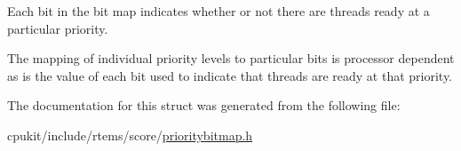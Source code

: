 Each bit in the bit map indicates whether or not there are threads ready at a particular priority. 

The mapping of individual priority levels to particular bits is processor dependent as is the value of each bit used to indicate that threads are ready at that priority. 

The documentation for this struct was generated from the following file\+:\begin{DoxyCompactItemize}
\item 
cpukit/include/rtems/score/\mbox{\hyperlink{prioritybitmap_8h}{prioritybitmap.\+h}}\end{DoxyCompactItemize}
